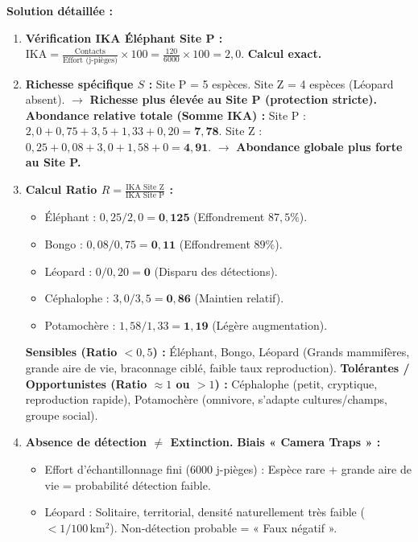 \documentclass[11pt]{article}
\begin{document}
\begin{exoresolu}
    \tcblower
    \textbf{Solution détaillée :}
    \begin{enumerate}
        \item \textbf{Vérification IKA Éléphant Site P :}
              $\text{IKA} = \frac{\text{Contacts}}{\text{Effort (j-pièges)}} \times 100 = \frac{120}{6000} \times 100 = 2,0$. \textbf{Calcul exact.}
        \item \textbf{Richesse spécifique $S$ :} Site P = 5 espèces. Site Z = 4 espèces (Léopard absent). $\rightarrow$ \textbf{Richesse plus élevée au Site P (protection stricte).}
              \textbf{Abondance relative totale (Somme IKA) :}
              Site P : $2,0 + 0,75 + 3,5 + 1,33 + 0,20 = \mathbf{7,78}$.
              Site Z : $0,25 + 0,08 + 3,0 + 1,58 + 0 = \mathbf{4,91}$.
              $\rightarrow$ \textbf{Abondance globale plus forte au Site P.}
        \item \textbf{Calcul Ratio $R = \frac{\text{IKA Site Z}}{\text{IKA Site P}}$ :}
              \begin{itemize}
                  \item Éléphant : $0,25 / 2,0 = \mathbf{0,125}$ (Effondrement $87,5\%$).
                  \item Bongo : $0,08 / 0,75 = \mathbf{0,11}$ (Effondrement $89\%$).
                  \item Léopard : $0 / 0,20 = \mathbf{0}$ (Disparu des détections).
                  \item Céphalophe : $3,0 / 3,5 = \mathbf{0,86}$ (Maintien relatif).
                  \item Potamochère : $1,58 / 1,33 = \mathbf{1,19}$ (Légère augmentation).
              \end{itemize}
              \textbf{Sensibles (Ratio $< 0,5$) :} Éléphant, Bongo, Léopard (Grands mammifères, grande aire de vie, braconnage ciblé, faible taux reproduction).
              \textbf{Tolérantes / Opportunistes (Ratio $\approx 1$ ou $> 1$) :} Céphalophe (petit, cryptique, reproduction rapide), Potamochère (omnivore, s'adapte cultures/champs, groupe social).
        \item \textbf{Absence de détection $\neq$ Extinction.}
              \textbf{Biais « Camera Traps » :}
              \begin{itemize}
                  \item Effort d'échantillonnage fini (6000 j-pièges) : Espèce rare + grande aire de vie = probabilité détection faible.
                  \item Léopard : Solitaire, territorial, densité naturellement très faible ($< 1/100\,\mathrm{km^2}$). Non-détection probable = « Faux négatif ».

\end{itemize}
\end{enumerate}
\end{exoresolu}
\end{document}
